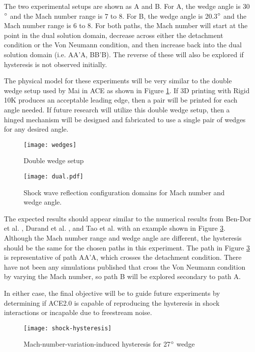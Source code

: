 The two experimental setups are shown as A and B. For A, the wedge angle is 30$\degree$ and the Mach number range is 7 to 8. For B, the wedge angle is 20.3$\degree$ and the Mach number range is 6 to 8. For both paths, the Mach number will start at the point in the dual solution domain, decrease across either the detachment condition or the Von Neumann condition, and then increase back into the dual solution domain (i.e. AA'A, BB'B). The reverse of these will also be explored if hysteresis is not observed initially.

The physical model for these experiments will be very similar to the double wedge setup used by Mai \cite{mai-dis} in ACE as shown in Figure \ref{fig:wedges}. If 3D printing with Rigid 10K produces an acceptable leading edge, then a pair will be printed for each angle needed. If future research will utilize this double wedge setup, then a hinged mechanism will be designed and fabricated to use a single pair of wedges for any desired angle.

\begin{figure}[ht!]
    \centering
    \texttt{[image: wedges]}
    \caption[Double wedge setup]{Double wedge setup \cite{mai-dis}}
    \label{fig:wedges}
\end{figure}


\begin{figure}[ht!]
    \centering
    \texttt{[image: dual.pdf]}
    \caption{Shock wave reflection configuration domains for Mach number and wedge angle.}
    \label{fig:dual}
\end{figure}

The expected results should appear similar to the numerical results from Ben-Dor et al. \cite{ben-dor-1}, Durand et al. \cite{durand}, and Tao et al. \cite{tao} with an example shown in Figure \ref{fig:shock-hysteresis}. Although the Mach number range and wedge angle are different, the hysteresis should be the same for the chosen paths in this experiment. The path in Figure \ref{fig:shock-hysteresis} is representative of path AA'A, which crosses the detachment condition. There have not been any simulations published that cross the Von Neumann condition by varying the Mach number, so path B will be explored secondary to path A.

In either case, the final objective will be to guide future experiments by determining if ACE2.0 is capable of reproducing the hysteresis in shock interactions or incapable due to freestream noise. 

\begin{figure}[ht!]
    \centering
    \texttt{[image: shock-hysteresis]}
    \caption[Mach-number-varitation-induced hysteresis for 27$\degree$ wedge]{Mach-number-variation-induced hysteresis for 27$\degree$ wedge \cite{ben-dor-1}}
    \label{fig:shock-hysteresis}
\end{figure}



